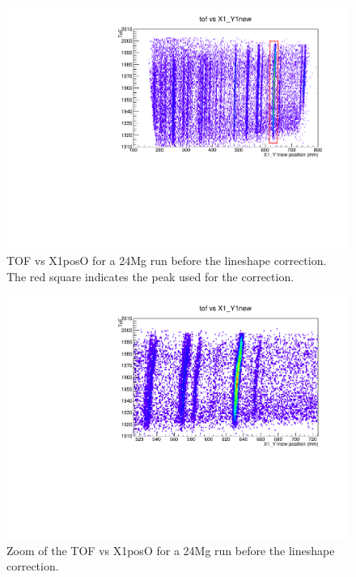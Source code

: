 \documentclass[]{report}
\begin{document}
\begin{figure}
	\includegraphics[width=\linewidth]{Figure/run2227-24Mg-lineshape-X1TOF-notcorr.pdf}
	\caption{TOF vs X1posO for a 24Mg run before the lineshape correction. The red square indicates the peak used for the correction.}
	\label{fig:TOFvsX1_notcorr}
\end{figure}

\begin{figure}
	\includegraphics[width=\linewidth]{Figure/run2227-24Mg-lineshape-X1TOF-notcorr-zoom.pdf}
	\caption{Zoom of the TOF vs X1posO for a 24Mg run before the lineshape correction.}
	\label{fig:TOFvsX1_notcorr_zoom}
\end{figure}
\end{document}
